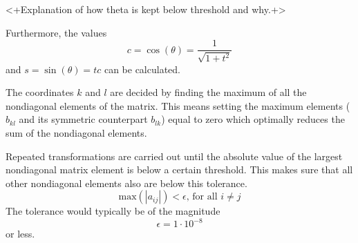 <+Explanation of how theta is kept below threshold and why.+>

Furthermore, the values \[c = \cos{(\theta)} = \frac{1}{\sqrt{1 +
t^2}}\] and $s = \sin{(\theta)} = tc$ can be calculated. 

The coordinates $k$ and $l$ are decided by finding the maximum of
all the nondiagonal elements of the matrix. This means setting the
maximum elements ($b_{kl}$ and its symmetric counterpart $b_{lk}$)
equal to zero which optimally reduces the sum of the nondiagonal
elements.

Repeated transformations are carried out until the absolute value
of the largest nondiagonal matrix element is below a certain
threshold. This makes sure that all other nondiagonal elements also
are below this tolerance. \[\text{max}(|a_{ij}|) < \epsilon \text{,
for all } i \neq j\] The tolerance would typically be of the
magnitude \[\epsilon = 1 \cdot 10^{-8}\] or less.
